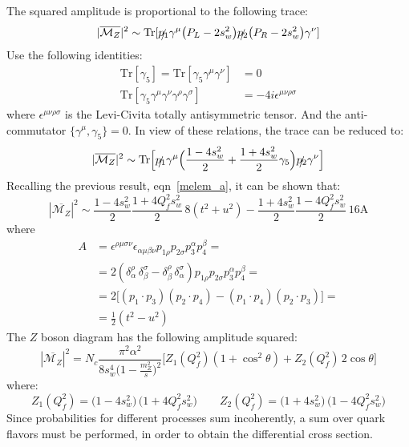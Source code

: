 \documentclass[]{article}
\begin{document}
The squared amplitude is proportional to the following trace:
\begin{equation}
|\overline{\mathcal{M}_Z}|^2 \sim \mathrm{Tr}[\slashed{p_1}\gamma^\mu
\big(P_L-2s^2_w\big) \slashed{p_2} \big(P_R-2s^2_w\big) \gamma^\nu ]
\end{equation}
Use the following identities:
\begin{align*}
\mathrm{Tr}[\gamma_5] = \mathrm{Tr}[\gamma_5\gamma^\mu\gamma^\nu]&=0 \\
\mathrm{Tr}[\gamma_5\gamma^\mu\gamma^\nu\gamma^\rho\gamma^\sigma] &= -4i\epsilon^{\mu\nu\rho\sigma} 
\end{align*}
where $\epsilon^{\mu\nu\rho\sigma}$ is the Levi-Civita totally antisymmetric tensor.
And the anti-commutator $\{\gamma^\mu, \gamma_5\}=0$. In view of these relations,
the trace can be reduced to:
\begin{equation}
|\overline{\mathcal{M}_Z}|^2 \sim \mathrm{Tr}\Big[\slashed{p_1}\gamma^\mu
\Big(\frac{1-4s^2_w}{2}+ \frac{1+4s^2_w}{2}\gamma_5\Big) \slashed{p_2} \gamma^\nu \Big]
\end{equation}
Recalling the previous result, eqn~\ref{melem_a}, it can be shown that:
\begin{equation}
|\overline{\mathcal{M}_Z}|^2 \sim
\frac{1-4s^2_w}{2}\frac{1+4Q^2_fs^2_w}{2}\,8(t^2+u^2) -
\frac{1+4s^2_w}{2}\frac{1-4Q^2_fs^2_w}{2}\,16\mathrm{A}
\end{equation}
where 
\begin{align*}
A&=\epsilon^{\rho\mu\sigma\nu}\epsilon_{\alpha\mu\beta\nu}p_{1\rho} p_{2\sigma} p_3^\alpha p_4^\beta = \\
&= 2(\delta^\rho_\alpha \,\delta^\sigma_\beta- \delta^\rho_\beta \,\delta^\sigma_\alpha)p_{1\rho} p_{2\sigma} p_3^\alpha p_4^\beta =\\
&=2\big[(p_1\cdot p_3)(p_2 \cdot p_4)-(p_1\cdot p_4)(p_2 \cdot p_3)\big]=\\
& =\frac{1}{2}(t^2-u^2)
\end{align*}
The $Z$ boson diagram has the following amplitude squared:
\begin{equation}
\label{Z2}
|\overline{\mathcal{M}_Z}|^2 =
N_c \frac{\pi^2\alpha^2 }{8s_w^4\Big(1-\frac{m_Z^2}{s}\Big)^2}
\Big[Z_1(Q_f^2)(1+\cos^2\theta)+Z_2(Q_f^2)\,2\cos\theta\Big]
\end{equation}
where:
\begin{equation}
\label{Z_coeff}
Z_1(Q_f^2) = \big(1-4s^2_w\big)\,\big(1+4Q^2_fs^2_w\big) \qquad
Z_2(Q_f^2) = \big(1+4s^2_w\big)\,\big(1-4Q^2_fs^2_w\big)
\end{equation}
Since probabilities for different processes sum incoherently, a sum over quark flavors must
be performed, in order to obtain the differential cross section.
\end{document}
